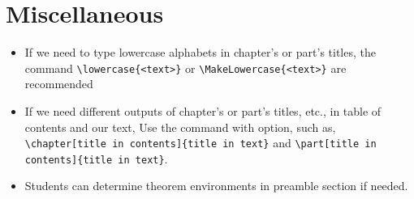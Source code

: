 \section{Miscellaneous} 
\begin{itemize}
	\item If we need to type lowercase alphabets in chapter’s or part’s titles, the command \verb|\lowercase{<text>}| or \verb|\MakeLowercase{<text>}| are recommended
	
	\item If we need different outputs of chapter’s or part’s titles, etc., in table of contents and our text, Use the command with option, such as, \verb|\chapter[title in contents]{title in text}| and \verb|\part[title in contents]{title in text}|.
	
	\item Students can determine theorem environments in preamble section if needed. 
\end{itemize}
